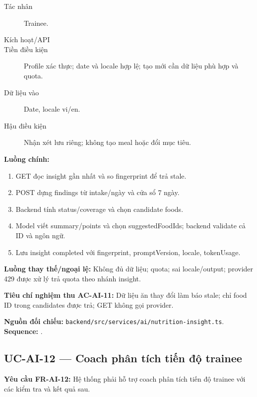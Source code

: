 \documentclass[12pt,a4paper]{article}
\newcommand{\evidence}[1]{{\small\nolinkurl{#1}}}
\begin{document}
\begin{description}
\item[Tác nhân] Trainee.
\item[Kích hoạt/API] 
\item[Tiền điều kiện] Profile xác thực; date và locale hợp lệ; tạo mới cần dữ liệu phù hợp và quota.
\item[Dữ liệu vào] Date, locale vi/en.
\item[Hậu điều kiện] Nhận xét lưu riêng; không tạo meal hoặc đổi mục tiêu.
\end{description}
\textbf{Luồng chính:}
\begin{enumerate}
  \item GET đọc insight gần nhất và so fingerprint để trả stale.
  \item POST dựng findings từ intake/ngày và cửa sổ 7 ngày.
  \item Backend tính status/coverage và chọn candidate foods.
  \item Model viết summary/points và chọn suggestedFoodIds; backend validate cả ID và ngôn ngữ.
  \item Lưu insight completed với fingerprint, promptVersion, locale, tokenUsage.
\end{enumerate}
\textbf{Luồng thay thế/ngoại lệ:} Không đủ dữ liệu; quota; sai locale/output; provider 429 được xử lý trả quota theo nhánh insight.

\textbf{Tiêu chí nghiệm thu AC-AI-11:} Dữ liệu ăn thay đổi làm báo stale; chỉ food ID trong candidates được trả; GET không gọi provider.

\textbf{Nguồn đối chiếu:} \evidence{backend/src/services/ai/nutrition-insight.ts}. \textbf{Sequence:} .

\subsection{UC-AI-12 --- Coach phân tích tiến độ trainee}
\label{uc-ai-12}
\textbf{Yêu cầu FR-AI-12:} Hệ thống phải hỗ trợ coach phân tích tiến độ trainee với các kiểm tra và kết quả sau.
\end{document}
